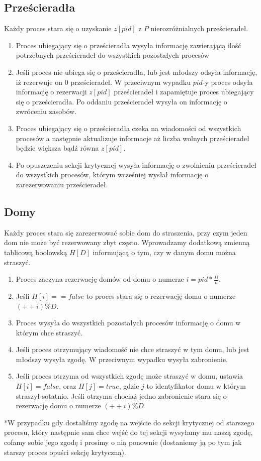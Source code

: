\documentclass{article}
\begin{document}
\subsection{Prześcieradła}
Każdy proces stara się o uzyskanie $z[pid]$ z $P$ nierozróżnialnych prześcieradeł.
\begin{enumerate}
    \item Proces ubiegający się o prześcieradła wysyła informację zawierającą ilość potrzebnych prześcieradeł do wszystkich pozostałych procesów
    \item Jeśli proces nie ubiega się o prześcieradła, lub jest młodszy odsyła informację, iż rezerwuje on $0$ prześcieradeł. W przeciwnym wypadku $pid$-y proces odsyła informację o rezerwacji $z[pid]$ prześcieradeł i zapamiętuje proces ubiegający się o prześcieradła. Po oddaniu prześcieradeł wysyła on informację o zwróceniu zasobów.
    \item Proces ubiegający się o prześcieradła czeka na wiadomości od wszystkich procesów a następnie aktualizuje informacje aż liczba wolnych prześcieradeł będzie większa bądź równa $z[pid]$.
    \item Po opuszczeniu sekcji krytycznej wysyła informację o zwolnieniu prześcieradeł do wszystkich procesów, którym wcześniej wysłał informację o zarezerwowaniu prześcieradeł.
\end{enumerate}
\subsection{Domy}
Każdy proces stara się zarezerwować sobie dom do straszenia, przy czym jeden dom nie może być rezerwowany zbyt często. Wprowadzamy dodatkową zmienną tablicową boolowską $H[D]$ informującą o tym, czy w danym domu można straszyć.
\begin{enumerate}
    \item Proces zaczyna rezerwację domów od domu o numerze $ i = pid * \frac{D}{n}$.
    \item Jeśli $H[i] == false$ to proces stara się o rezerwację domu o numerze $(++i) \% D$.
    \item Proces wysyła do wszystkich pozostałych procesów informację o domu w którym chce straszyć.
    \item Jeśli proces otrzymujący wiadomość nie chce straszyć w tym domu, lub jest młodszy wysyła zgodę. W przeciwnym wypadku wysyła zabronienie.
    \item Jeśli proces otrzyma od wszystkich zgodę może straszyć w domu, ustawia $H[i] = false$, oraz $H[j] = true$, gdzie $j$ to identyfikator domu w którym straszył sotatnio. Jeśli otrzyma chociaż jedno zabronienie stara się o rezerwację domu o numerze $(++i) \% D$
\end{enumerate}

*W przypadku gdy dostaliśmy zgodę na wejście do sekcji krytycznej od starszego procesu, który następnie sam chce wejść do tej sekcji wysyłamy mu naszą zgodę, cofamy sobie jego zgodę i prosimy o nią ponownie (dostaniemy ją po tym jak starszy proces opuści sekcję krytyczną).




\end{document}
